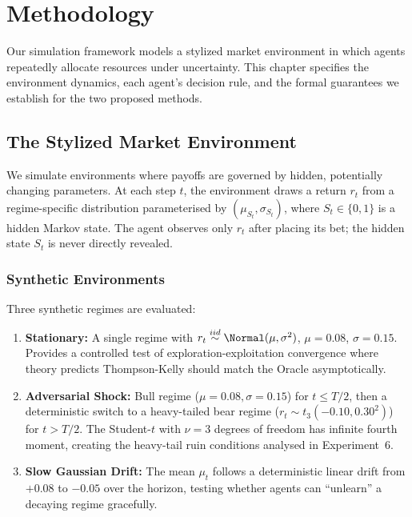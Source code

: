 \chapter{Methodology}
\label{ch:methodology}

Our simulation framework models a stylized market environment in which agents
repeatedly allocate resources under uncertainty. This chapter specifies the
environment dynamics, each agent's decision rule, and the formal guarantees
we establish for the two proposed methods.

\section{The Stylized Market Environment}

We simulate environments where payoffs are governed by hidden, potentially
changing parameters. At each step $t$, the environment draws a return
$r_t$ from a regime-specific distribution parameterised by $(\mu_{S_t},
\sigma_{S_t})$, where $S_t \in \{0,1\}$ is a hidden Markov state. The agent
observes only $r_t$ after placing its bet; the hidden state $S_t$ is
never directly revealed.

\subsection{Synthetic Environments}

Three synthetic regimes are evaluated:

\begin{enumerate}
    \item \textbf{Stationary:} A single regime with $r_t \overset{iid}{\sim}
    \Normal(\mu, \sigma^2)$, $\mu = 0.08$, $\sigma = 0.15$. Provides a
    controlled test of exploration-exploitation convergence where theory
    predicts Thompson-Kelly should match the Oracle asymptotically.

    \item \textbf{Adversarial Shock:} Bull regime ($\mu = 0.08, \sigma = 0.15$)
    for $t \leq T/2$, then a deterministic switch to a heavy-tailed bear
    regime ($r_t \sim t_3(-0.10, 0.30^2)$) for $t > T/2$. The Student-$t$
    with $\nu=3$ degrees of freedom has infinite fourth moment, creating the
    heavy-tail ruin conditions analysed in Experiment~6.

    \item \textbf{Slow Gaussian Drift:} The mean $\mu_t$ follows a
    deterministic linear drift from $+0.08$ to $-0.05$ over the horizon,
    testing whether agents can ``unlearn'' a decaying regime gracefully.
\end{enumerate}

